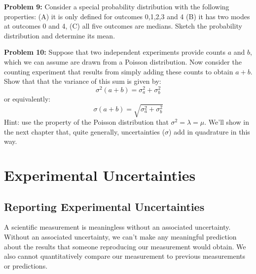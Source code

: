 \documentclass[12pt,oneside]{book}
\begin{document}
\vskip 1cm
\noindent
{\bf Problem 9:} Consider a special probability distribution with the
following properties: (A) it is only defined for outcomes 0,1,2,3 and
4 (B) it has two modes at outcomes 0 and 4, (C) all five outcomes are
medians.  Sketch the probability distribution and determine its mean.

\vskip 1cm
\noindent
{\bf Problem 10:} Suppose that two independent experiments provide counts $a$ and $b$, which we can assume are drawn from a Poisson distribution.  Now consider the counting experiment that results from simply adding these counts to obtain $a+b$.  Show that that the variance of this sum is given by:
\begin{displaymath}
\sigma^2(a+b) = \sigma^2_a + \sigma^2_b
\end{displaymath}
or equivalently:
\begin{displaymath}
\sigma(a+b) = \sqrt{\sigma^2_a + \sigma^2_b}
\end{displaymath}
Hint: use the property of the Poisson distribution that $\sigma^2 =
\lambda = \mu$.  We'll show in the next chapter that, quite generally,
uncertainties ($\sigma$) add in quadrature in this way.

\newpage

\chapter{Experimental Uncertainties}

\section{Reporting Experimental Uncertainties}

A scientific measurement is meaningless without an associated
uncertainty.  Without an associated uncertainty, we can't make any
meaningful prediction about the results that someone reproducing our
measurement would obtain.  We also cannot quantitatively compare our
measurement to previous measurements or predictions.
\end{document}

